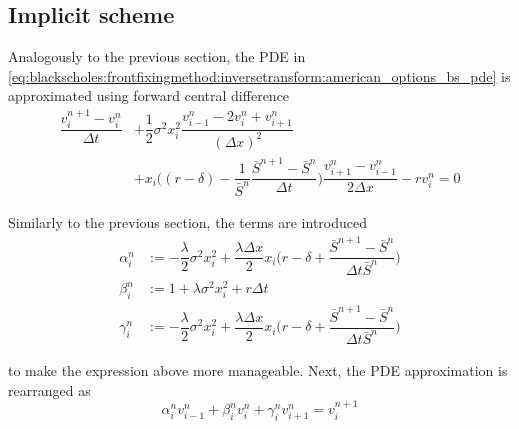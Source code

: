 \subsection{Implicit scheme}

Analogously to the previous section, the PDE in \eqref{eq:blackscholes:frontfixingmethod:inversetransform:american_options_bs_pde} 
is approximated using forward central difference  
\begin{equation*}
  \begin{split}
    \dfrac{v^{n+1}_{i} - v^{n}_{i}}{\Delta{t}} & + \dfrac{1}{2}\sigma^2 x_i^2 \dfrac{v^{n}_{i-1} - 2v^{n}_{i} + v^{n}_{i+1}}{(\Delta{x})^2} \\ 
     & + x_i\bigg( (r-\delta) - \dfrac{1}{\bar{S}^{n}}\dfrac{\bar{S}^{n+1} - \bar{S}^{n}}{\Delta{t}} \bigg)\dfrac{v^{n}_{i+1} - v^{n}_{i-1}}{2\Delta{x}} - rv^{n}_{i} = 0
  \end{split}
\end{equation*}

Similarly to the previous section, the terms are introduced  
\begin{align}
  \alpha^{n}_{i} &:= -\dfrac{\lambda}{2}\sigma^2x^{2}_{i} + \dfrac{\lambda\Delta{x}}{2}x_{i}\bigg(r-\delta+\dfrac{\bar{S}^{n+1}-\bar{S}^n}{\Delta{t}\bar{S}^{n}}\bigg) \\
  \beta^{n}_{i} &:= 1 + \lambda\sigma^2x^{2}_{i} + r\Delta{t} \\
  \gamma^{n}_{i} &:= -\dfrac{\lambda}{2}\sigma^2x^{2}_{i} + \dfrac{\lambda\Delta{x}}{2}x_{i}\bigg(r-\delta+\dfrac{\bar{S}^{n+1}-\bar{S}^n}{\Delta{t}\bar{S}^{n}}\bigg)
\end{align}

to make the expression above more manageable. Next, the PDE approximation is rearranged as
\begin{equation*}
  \alpha^{n}_{i}v^{n}_{i-1} + \beta^{n}_{i}v^{n}_{i} + \gamma^{n}_{i}v^{n}_{i+1} = v^{n+1}_{i}
\end{equation*}

